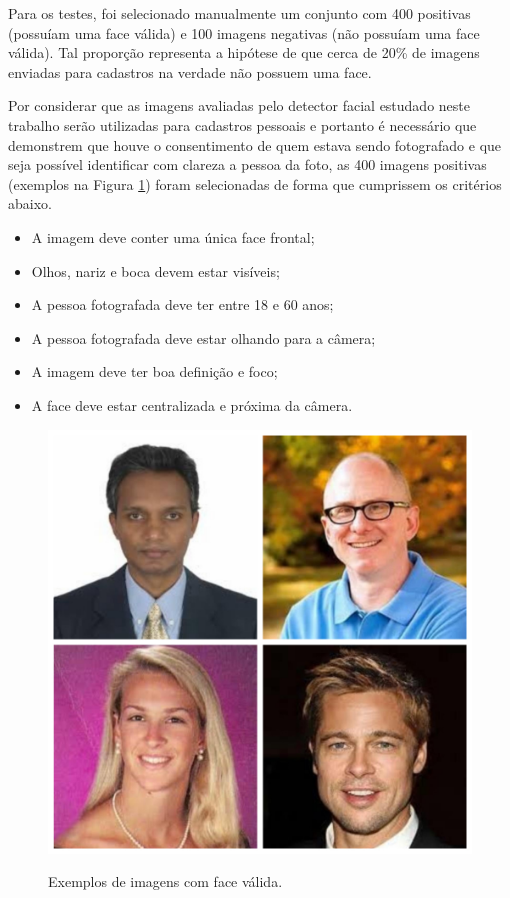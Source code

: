 Para os testes, foi selecionado manualmente um conjunto com 400 positivas (possuíam uma face válida) e 100 imagens negativas (não possuíam uma face válida). Tal proporção representa a hipótese de que cerca de 20\% de imagens enviadas para cadastros na verdade não possuem uma face.

Por considerar que as imagens avaliadas pelo detector facial estudado neste trabalho serão utilizadas para cadastros pessoais e portanto é necessário que demonstrem que houve o consentimento de quem estava sendo fotografado e que seja possível identificar com clareza a pessoa da foto, as 400 imagens positivas (exemplos na Figura \ref{fig:valid-faces}) foram selecionadas de forma que cumprissem os critérios abaixo.

\begin{itemize}
    \item A imagem deve conter uma única face frontal;
    \item Olhos, nariz e boca devem estar visíveis;
    \item A pessoa fotografada deve ter entre 18 e 60 anos;
    \item A pessoa fotografada deve estar olhando para a câmera;
    \item A imagem deve ter boa definição e foco;
    \item A face deve estar centralizada e próxima da câmera.
\end{itemize}

\begin{figure}[htbp]
    \centering
    \caption{Exemplos de imagens com face válida.}
    \includegraphics[scale=.25]{figs/valid_faces.jpg}
    \label{fig:valid-faces}
\end{figure}

